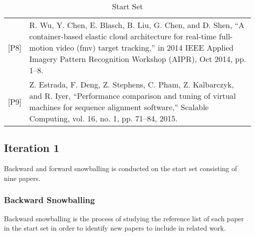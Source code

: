 \begin{table}[]
\begin{tabular}{lp{13cm}}
{[}P8{]}  & R. Wu, Y. Chen, E. Blasch, B. Liu, G. Chen, and D. Shen, “A container-based elastic cloud architecture for real-time full-motion video (fmv) target tracking,” in 2014 IEEE Applied Imagery Pattern Recognition Workshop (AIPR), Oct 2014, pp. 1–8.                                                                                  \\
{[}P9{]} & Z. Estrada, F. Deng, Z. Stephens, C. Pham, Z. Kalbarczyk, and R. Iyer, “Performance comparison and tuning of virtual machines for sequence alignment software,” Scalable Computing, vol. 16, no. 1, pp. 71–84, 2015.
\end{tabular}
\centering
\caption{Start Set}
\label{lr-startset}
\end{table}


\subsection{Iteration 1}
Backward and forward snowballing is conducted on the start set consisting of nine papers.

\subsubsection{Backward Snowballing}
Backward snowballing is the process of studying the reference list of each paper in the start set in order to identify new papers to include in related work. \\

